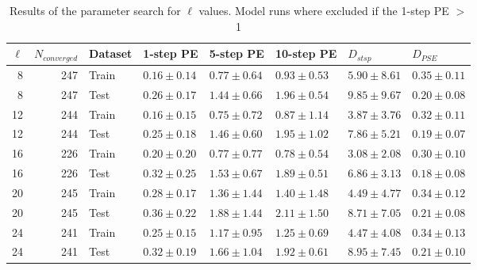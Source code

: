 \begin{table}
\centering
\caption{Results of the parameter search for $\ell$ values. Model runs where excluded if the 1-step PE $>$ 1}
\label{tab:gridsearch_ldim_table}
\begin{tabular}{rrllllll}
\toprule
$\ell$ & $N_{converged}$ & Dataset & 1-step PE & 5-step PE & 10-step PE & $D_{stsp}$ & $D_{PSE}$ \\
\midrule
8 & 247 & Train & $0.16 \pm 0.14$ & $0.77 \pm 0.64$ & $0.93 \pm 0.53$ & $5.90 \pm 8.61$ & $0.35 \pm 0.11$ \\
8 & 247 & Test & $0.26 \pm 0.17$ & $1.44 \pm 0.66$ & $1.96 \pm 0.54$ & $9.85 \pm 9.67$ & $0.20 \pm 0.08$ \\
12 & 244 & Train & $0.16 \pm 0.15$ & $0.75 \pm 0.72$ & $0.87 \pm 1.14$ & $3.87 \pm 3.76$ & $0.32 \pm 0.11$ \\
12 & 244 & Test & $0.25 \pm 0.18$ & $1.46 \pm 0.60$ & $1.95 \pm 1.02$ & $7.86 \pm 5.21$ & $0.19 \pm 0.07$ \\
16 & 226 & Train & $0.20 \pm 0.20$ & $0.77 \pm 0.77$ & $0.78 \pm 0.54$ & $3.08 \pm 2.08$ & $0.30 \pm 0.10$ \\
16 & 226 & Test & $0.32 \pm 0.25$ & $1.53 \pm 0.67$ & $1.89 \pm 0.51$ & $6.86 \pm 3.13$ & $0.18 \pm 0.08$ \\
20 & 245 & Train & $0.28 \pm 0.17$ & $1.36 \pm 1.44$ & $1.40 \pm 1.48$ & $4.49 \pm 4.77$ & $0.34 \pm 0.12$ \\
20 & 245 & Test & $0.36 \pm 0.22$ & $1.88 \pm 1.44$ & $2.11 \pm 1.50$ & $8.71 \pm 7.05$ & $0.21 \pm 0.08$ \\
24 & 241 & Train & $0.25 \pm 0.15$ & $1.17 \pm 0.95$ & $1.25 \pm 0.69$ & $4.47 \pm 4.08$ & $0.34 \pm 0.13$ \\
24 & 241 & Test & $0.32 \pm 0.19$ & $1.66 \pm 1.04$ & $1.92 \pm 0.61$ & $8.95 \pm 7.45$ & $0.21 \pm 0.10$ \\
\bottomrule
\end{tabular}
\end{table}
